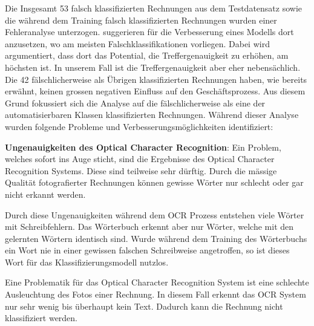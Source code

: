 

Die Insgesamt 53 falsch klassifizierten Rechnungen aus dem Testdatensatz sowie die während dem Training falsch klassifizierten Rechnungen wurden einer Fehleranalyse unterzogen. \textcite{MLYearning} suggerieren für die Verbesserung eines Modells dort anzusetzen, wo am meisten Falschklassifikationen vorliegen. Dabei wird argumentiert, dass dort das Potential, die Treffergenauigkeit zu erhöhen, am höchsten ist. In unserem Fall ist die Treffergenauigkeit aber eher nebensächlich. Die 42 fälschlicherweise als Übrigen klassifizierten Rechnungen haben, wie bereits erwähnt, keinen grossen negativen Einfluss auf den Geschäftsprozess. Aus diesem Grund fokussiert sich die Analyse auf die fälschlicherweise als eine der automatisierbaren Klassen klassifizierten Rechnungen. Während dieser Analyse wurden folgende Probleme und Verbesserungsmöglichkeiten identifiziert:

\newpage


\label{chap:ocr-quality}
\textbf{Ungenauigkeiten des Optical Character Recognition}: Ein Problem, welches sofort ins Auge sticht, sind die Ergebnisse des Optical Character Recognition Systems. Diese sind teilweise sehr dürftig. Durch die mässige Qualität fotografierter Rechnungen können gewisse Wörter nur schlecht oder gar nicht erkannt werden. 

Durch diese Ungenauigkeiten während dem OCR Prozess entstehen viele Wörter mit Schreibfehlern. Das Wörterbuch erkennt aber nur Wörter, welche mit den gelernten Wörtern identisch sind. Wurde während dem Training des Wörterbuchs ein Wort nie in einer gewissen falschen Schreibweise angetroffen, so ist dieses Wort für das Klassifizierungsmodell nutzlos.

Eine Problematik für das Optical Character Recognition System ist eine schlechte Ausleuchtung des Fotos einer Rechnung. In diesem Fall erkennt das OCR System nur sehr wenig bis überhaupt kein Text. Dadurch kann die Rechnung nicht klassifiziert werden.

